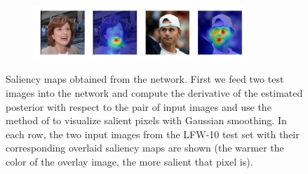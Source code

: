 \begin{figure}[th!]
    \begin{subfigure}
        \centering
        \includegraphics[width=8cm, trim={0 1cm 0 0},clip]{saliency-new/saliency-smooth/goodlooking-1.jpeg}
        \footnotesize
    \end{subfigure}
    
    \caption{Saliency maps obtained from the network. First we feed two test images into the network and compute the derivative of the estimated posterior with respect to the pair of input images and use the method of \cite{saliency} to visualize salient pixels with  Gaussian smoothing. In each row, the two input images from the LFW-10 test set with their corresponding overlaid saliency maps are shown (the warmer the color of the overlay image, the more salient that pixel is).}
    \label{fig.5}
\end{figure}
